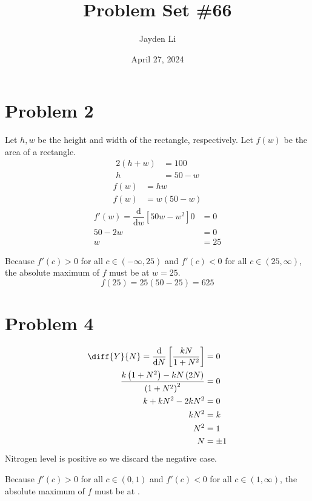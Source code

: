 \documentclass{article}
\title{Problem Set \#66}
\author{Jayden Li}
\date{April 27, 2024}
\newcommand*{\paren}[1]{\ensuremath\left(#1\right)}
\newcommand*{\problem}[1]{\section*{Problem #1}}
\newcommand*{\Deriv}[2][x]{\ensuremath{\dfrac{\mathrm{d}}{\mathrm{d}#1}\left[#2\right]}}
\begin{document}
\fontsize{12pt}{12pt}\selectfont
\setlength{\abovedisplayskip}{0pt}
\maketitle

\problem{2}
Let $h,w$ be the height and width of the rectangle, respectively. Let $f(w)$ be the area of a rectangle.
\begin{align*}
	2(h+w)&=100 \\
	h&=50-w
\end{align*}
\begin{align*}
	f(w)&=hw \\
	f(w)&=w(50-w)
\end{align*}
\begin{align*}
	f'(w)=\Deriv[w]{50w-w^2}0&=0 \\
	50-2w&=0 \\
	w&=25
\end{align*}
\begin{center}
\end{center}
Because $f'(c)>0$ for all $c\in(-\infty,25)$ and $f'(c)<0$ for all $c\in(25,\infty)$, the absolute maximum of $f$ must be at $w=25$.
\begin{equation*}
	f(25)=25(50-25)=\boxed{625}
\end{equation*}

\problem{4}
\begin{align*}
	\diff{Y}{N}=\Deriv[N]{\frac{kN}{1+N^2}}&=0 \\
	\frac{k\paren{1+N^2}-kN\paren{2N}}{\paren{1+N^2}^2}&=0 \\
	k+kN^2-2kN^2&=0 \\
	kN^2&=k \\
	N^2&=1 \\
	N&=\pm1
\end{align*}
Nitrogen level is positive so we discard the negative case.
\begin{center}
\end{center}
Because $f'(c)>0$ for all $c\in(0,1)$ and $f'(c)<0$ for all $c\in(1,\infty)$, the absolute maximum of $f$ must be at .
\end{document}
